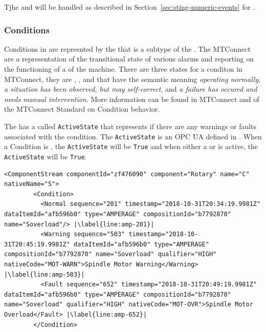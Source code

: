Tjhe  and  will be handled as described in Section~\ref{sec:sting-numeric-events} for .

\FloatBarrier

\subsubsection{Conditions}

Conditions in are represnted by the  that is a subtype of the . The MTConnect  are a representation of the transitional state of various alarms and reporting on the functioning of a  of the machine. There are three states for a conditon in MTConnect, they are , , and  that have the semantic meaning \textit{operating normally}, \textit{a situation has been observed, but may self-correct}, and \textit{a failure has occured and needs manual intervention}. More information can be found in MTConnect \cite{MTCPart2} and \cite{MTCPart3} of the MTConnect Standard on Condition behavior.

The  has a  called \texttt{ActiveState} that represents if there are any warnings or faults associated with the condition. The \texttt{ActiveState} is an OPC UA  defined in \cite{UAPart8}. When a Condition is , the \texttt{ActiveState} will be \texttt{True} and when either a  or  is active, the \texttt{ActiveState} will be \texttt{True}.

\begin{lstlisting}[firstnumber=last,escapechar=|,%
    caption={Rotary C Component Stream},label={lst:rotary-component-stream}]
      <ComponentStream componentId="zf476090" component="Rotary" name="C" nativeName="S">
        <Condition>
          <Normal sequence="201" timestamp="2018-10-31T20:34:19.9981Z" dataItemId="afb596b0" type="AMPERAGE" compositionId="b7792870" name="Soverload"/> |\label{line:amp-201}|
          <Warning sequence="503" timestamp="2018-10-31T20:45:19.9981Z" dataItemId="afb596b0" type="AMPERAGE" compositionId="b7792870" name="Soverload" qualifier="HIGH" nativeCode="MOT-WARN">Spindle Motor Warning</Warning> |\label{line:amp-503}|
          <Fault sequence="652" timestamp="2018-10-31T20:49:19.9981Z" dataItemId="afb596b0" type="AMPERAGE" compositionId="b7792870" name="Soverload" qualifier="HIGH" nativeCode="MOT-OVR">Spindle Motor Overload</Fault> |\label{line:amp-652}|
        </Condition>
\end{lstlisting}

